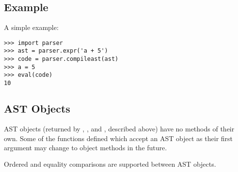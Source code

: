 \subsection{Example}

A simple example:

\begin{verbatim}
>>> import parser
>>> ast = parser.expr('a + 5')
>>> code = parser.compileast(ast)
>>> a = 5
>>> eval(code)
10
\end{verbatim}


\subsection{AST Objects}

AST objects (returned by , , and
, described above) have no methods of their own.
Some of the functions defined which accept an AST object as their
first argument may change to object methods in the future.

Ordered and equality comparisons are supported between AST objects.

\renewcommand{\indexsubitem}{(ast method)}

